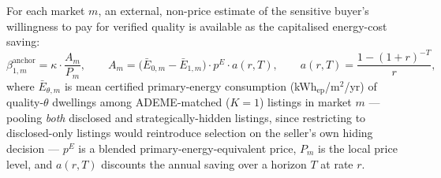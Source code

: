 \label{assum:energy_anchor}
For each market $m$, an external, non-price estimate of the sensitive buyer's willingness to
pay for verified quality is available as the capitalised energy-cost saving:
\begin{equation}
    \beta_{1,m}^{\mathrm{anchor}} = \kappa\cdot\frac{A_m}{P_m}, \qquad
    A_m = \big(\bar E_{0,m}-\bar E_{1,m}\big)\cdot p^E\cdot a(r,T), \qquad
    a(r,T)=\frac{1-(1+r)^{-T}}{r},
    \label{eq:energy_anchor}
\end{equation}
where $\bar E_{\theta,m}$ is mean certified primary-energy consumption (kWh$_{\mathrm{ep}}$/m$^2$/yr)
of quality-$\theta$ dwellings among ADEME-matched ($K=1$) listings in market $m$ --- pooling
\emph{both} disclosed and strategically-hidden listings, since restricting to disclosed-only
listings would reintroduce selection on the seller's own hiding decision --- $p^E$ is a
blended primary-energy-equivalent price, $P_m$ is the local price level, and $a(r,T)$ discounts
the annual saving over a horizon $T$ at rate $r$.
